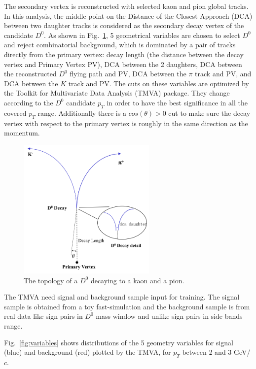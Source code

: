 \documentclass[a4paper]{article}
\begin{document}
The secondary vertex is reconstructed with selected kaon and pion global tracks. In this analysis, the middle point on the Distance of the Closest Approach (DCA) between two daughter tracks is considered as the secondary decay vertex of the candidate $D^0$. As shown in Fig.~\ref{fig:D0cartoon}, 5 geometrical variables are chosen to select $D^0$ and reject combinatorial background, which is dominated by a pair of tracks directly from the primary vertex: decay length (the distance between the decay vertex and Primary Vertex PV), DCA between the 2 daughters, DCA between the reconstructed $D^0$ flying path and PV, DCA between the $\pi$ track and PV, and DCA between the $K$ track and PV. The cuts on these variables are optimized by the Toolkit for Multivariate Data Analysis (TMVA) package. They change according to the $D^0$ candidate $p_T$ in order to have the best significance in all the covered $p_T$ range. Additionally there is a $cos(\theta) > 0$ cut to make sure the decay vertex with respect to the primary vertex is roughly in the same direction as the momentum.

\begin{figure}[htbp]
\centering
\includegraphics[keepaspectratio,width=0.6\textwidth]{fig/D0cartoon.png}
\caption{The topology of a $D^0$ decaying to a kaon and a pion.}
 \label{fig:D0cartoon}
\end{figure}

The TMVA need signal and background sample input for training. The signal sample is obtained from a toy fast-simulation and the background sample is from real data like sign pairs in $D^0$ mass window and unlike sign pairs in side bands range. 

Fig.~\ref{fig:variables} shows distributions of the 5 geometry variables for signal (blue) and background (red) plotted by the TMVA, for $p_T$ between 2 and 3 GeV/$c$.
\end{document}

